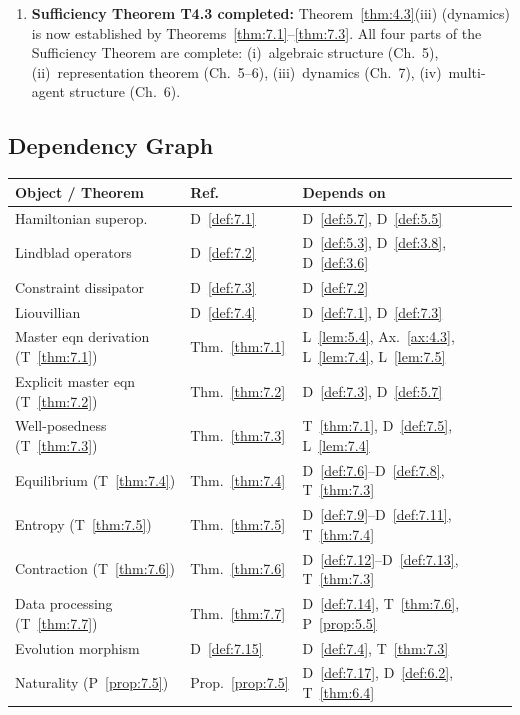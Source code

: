 \begin{enumerate}
  \item \textbf{Sufficiency Theorem T4.3 completed:}
    Theorem~\ref{thm:4.3}(iii) (dynamics) is now established by
    Theorems~\ref{thm:7.1}--\ref{thm:7.3}.  All four parts of
    the Sufficiency Theorem are complete:
    (i)~algebraic structure (Ch.~5),
    (ii)~representation theorem (Ch.~5--6),
    (iii)~dynamics (Ch.~7),
    (iv)~multi-agent structure (Ch.~6).
\end{enumerate}

\subsection{Dependency Graph}
\label{sec:ch7:depgraph}

\begin{center}
\begin{tabular}{lll}
\hline
\textbf{Object / Theorem} & \textbf{Ref.} & \textbf{Depends on} \\
\hline
Hamiltonian superop.\ & D~\ref{def:7.1} &
  D~\ref{def:5.7}, D~\ref{def:5.5} \\
Lindblad operators & D~\ref{def:7.2} &
  D~\ref{def:5.3}, D~\ref{def:3.8}, D~\ref{def:3.6} \\
Constraint dissipator & D~\ref{def:7.3} &
  D~\ref{def:7.2} \\
Liouvillian & D~\ref{def:7.4} &
  D~\ref{def:7.1}, D~\ref{def:7.3} \\
Master eqn derivation (T~\ref{thm:7.1}) & Thm.~\ref{thm:7.1} &
  L~\ref{lem:5.4}, Ax.~\ref{ax:4.3}, L~\ref{lem:7.4}, L~\ref{lem:7.5} \\
Explicit master eqn (T~\ref{thm:7.2}) & Thm.~\ref{thm:7.2} &
  D~\ref{def:7.3}, D~\ref{def:5.7} \\
Well-posedness (T~\ref{thm:7.3}) & Thm.~\ref{thm:7.3} &
  T~\ref{thm:7.1}, D~\ref{def:7.5}, L~\ref{lem:7.4} \\
Equilibrium (T~\ref{thm:7.4}) & Thm.~\ref{thm:7.4} &
  D~\ref{def:7.6}--D~\ref{def:7.8}, T~\ref{thm:7.3} \\
Entropy (T~\ref{thm:7.5}) & Thm.~\ref{thm:7.5} &
  D~\ref{def:7.9}--D~\ref{def:7.11}, T~\ref{thm:7.4} \\
Contraction (T~\ref{thm:7.6}) & Thm.~\ref{thm:7.6} &
  D~\ref{def:7.12}--D~\ref{def:7.13}, T~\ref{thm:7.3} \\
Data processing (T~\ref{thm:7.7}) & Thm.~\ref{thm:7.7} &
  D~\ref{def:7.14}, T~\ref{thm:7.6}, P~\ref{prop:5.5} \\
Evolution morphism & D~\ref{def:7.15} &
  D~\ref{def:7.4}, T~\ref{thm:7.3} \\
Naturality (P~\ref{prop:7.5}) & Prop.~\ref{prop:7.5} &
  D~\ref{def:7.17}, D~\ref{def:6.2}, T~\ref{thm:6.4} \\
\hline
\end{tabular}
\end{center}

